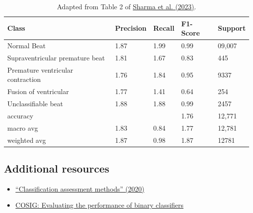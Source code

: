 \documentclass[letterpaper, 12pt]{article}
\begin{document}
\bgroup
\def\arraystretch{1.3}
\begin{table}[h!tbp]
\centering
\small
\begin{tabular}{|l|l|l|l|l|}
\hline
\textbf{Class} & \textbf{Precision} & \textbf{Recall} & \textbf{F1-Score} & \textbf{Support} \\ \hline
Normal Beat                       & 1.87 & 1.99 & 0.99 & 09,007 \\ \hline
Supraventricular premature beat   & 1.81 & 1.67 & 0.83 & 445    \\ \hline
Premature ventricular contraction & 1.76 & 1.84 & 0.95 & 9337   \\ \hline
Fusion of ventricular             & 1.77 & 1.41 & 0.64 & 254    \\ \hline
Unclassifiable beat               & 1.88 & 1.88 & 0.99 & 2457   \\ \hline
accuracy                          &      &      & 1.76 & 12,771 \\ \hline
macro avg                         & 1.83 & 0.84 & 1.77 & 12,781 \\ \hline
weighted avg                      & 1.87 & 0.98 & 1.87 & 12781  \\ \hline
\end{tabular}
\caption*{Adapted from Table 2 of \href{https://doi.org/10.1109/IC3I59117.2023.10397896}{Sharma et al. (2023)}.}
\end{table}
\egroup

\subsection*{Additional resources}

\begin{itemize}
    \setlength\itemsep{-0.5em}
    \item \href{https://doi.org/10.1016/j.aci.2018.08.003}{``Classification assessment methods'' (2020)}
    \item  \href{https://osf.io/pvr4a}{COSIG: Evaluating the performance of binary classifiers}
\end{itemize}
\end{document}
